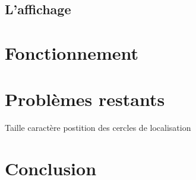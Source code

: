 \documentclass[a4paper,12pt,titlepage]{report}
\begin{document}
	\subsection{L'affichage}
	\section{Fonctionnement}	
	
	\section{Problèmes restants}
	Taille caractère
	postition des cercles de localisation
	\section*{Conclusion}
\end{document}
